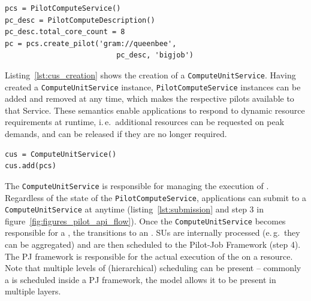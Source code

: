 \documentclass[conference]{IEEEtran}
\begin{document}
\lstset{
language=Python,
frame=single,
captionpos=b,
stringstyle=\ttfamily,
basicstyle=\scriptsize\ttfamily
}

\begin{minipage}{0.45 \textwidth}
\begin{lstlisting}[caption={\I{Creation of a \T{PilotCompute} instance using a \T{Pi\-lot\-Compute\-Description}.}}, label={lst:pcs_creation}]
pcs = PilotComputeService()
pc_desc = PilotComputeDescription()
pc_desc.total_core_count = 8
pc = pcs.create_pilot('gram://queenbee', 
                          pc_desc, 'bigjob')
\end{lstlisting}
\end{minipage}

Listing~\ref{lst:cus_creation} shows the creation of
a \texttt{Compute\-Unit\-Service}.  Having created
a \texttt{Compute\-Unit\-Service} instance, \texttt{Pilot\-Compute\-Service}
instances can be added and removed at any time, which makes the respective pilots available to that Service.  These semantics enable applications to
respond to dynamic resource requirements at runtime, i.\,e.\ additional
resources can be requested on peak demands, and can be released if they are no
longer required.\\

\begin{minipage}{0.45 \textwidth}
\begin{lstlisting}[caption={\I{Instantiation
of a \texttt{ComputeUnitService} using a reference to the
\texttt{PilotComputeService}.}}, label={lst:cus_creation}]
cus = ComputeUnitService()
cus.add(pcs)
\end{lstlisting}
\end{minipage}


The \texttt{Compute\-Unit\-Service} is responsible for managing the execution of
\cus.
Regardless of the state of the \texttt{Pilot\-Compute\-Service}, applications can submit \cus to a
\texttt{Compute\-Unit\-Service} at anytime (listing~\ref{lst:submission} and step 3
in figure~\ref{fig:figures_pilot_api_flow}). 
Once the \texttt{Compute\-Unit\-Service} becomes responsible for a \cu, the \cu
transitions to an \su.
SUs are internally processed (e.\,g.\ they can be aggregated) and are then scheduled to the Pilot-Job Framework (step 4). 
The PJ framework is responsible for the actual execution of the \su on a
resource.
Note that multiple levels of (hierarchical) scheduling can be present -- commonly
a \su is scheduled inside a PJ framework, the model allows it to be present
in multiple layers.\\
\end{document}

